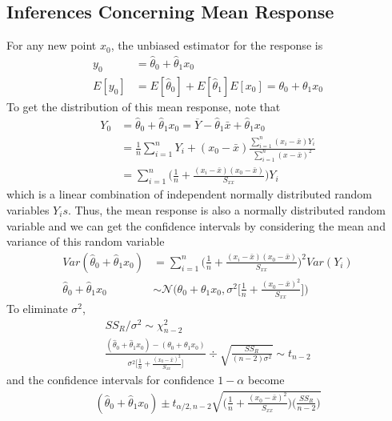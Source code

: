 \documentclass[../probability-notes.tex]{subfiles}
\begin{document}
    \subsection{Inferences Concerning Mean Response}\label{sec:infer_mean_resp}
    For any new point $x_{0}$, the unbiased estimator for the response is
    \begin{align*}
        y_{0} &= \hat{\theta}_{0} + \hat{\theta}_{1}x_{0}\\
        E[y_{0}] &= E[\hat{\theta}_{0}] + E[\hat{\theta}_{1}]E[x_{0}] = \theta_{0} + \theta_{1}x_{0}
    \end{align*}
    To get the distribution of this mean response, note that
    \begin{align*}
        Y_{0} &= \hat{\theta}_{0} + \hat{\theta}_{1}x_{0} = \overline{Y} - \hat{\theta}_{1}\bar{x} + \hat{\theta}_{1}x_{0}\\
        &= \frac{1}{n}\sum_{i=1}^{n} Y_{i} + (x_{0} - \bar{x})\frac{\sum_{i=1}^{n} (x_{i} - \bar{x})Y_{i}}{\sum_{i=1}^{n} (x-\bar{x})^{2}}\\
        &= \sum_{i=1}^{n} \bigg( \frac{1}{n} + \frac{(x_{i} - \bar{x})(x_{0} - \bar{x})}{S_{xx}} \bigg)Y_{i}
    \end{align*}
    which is a linear combination of independent normally distributed random variables $Y_{i}s$. Thus, the mean response is also a normally distributed random variable and we can get the confidence intervals by considering the mean and variance of this random variable
    \begin{align*}
        Var(\hat{\theta}_{0} + \hat{\theta}_{1}x_{0}) &= \sum_{i=1}^{n} \bigg( \frac{1}{n} + \frac{(x_{i} - \bar{x})(x_{0} - \bar{x})}{S_{xx}} \bigg)^{2}Var(Y_{i})\\
        \hat{\theta}_{0} + \hat{\theta}_{1}x_{0} &\sim \mathcal{N}\bigg(\theta_{0} + \theta_{1}x_{0}, \sigma^{2} \bigg[ \frac{1}{n} + \frac{(x_{0} - \bar{x})^{2}}{S_{xx}} \bigg]\bigg)
    \end{align*}
    To eliminate $\sigma^{2}$,
    \begin{gather*}
        SS_{R}/\sigma^{2} \sim \chi_{n-2}^{2}\\
        \frac{(\hat{\theta}_{0} + \hat{\theta}_{1}x_{0}) - (\theta_{0} + \theta_{1}x_{0})}{\sigma^{2} \bigg[ \frac{1}{n} + \frac{(x_{0} - \bar{x})^{2}}{S_{xx}} \bigg]} \div \sqrt{\frac{SS_{R}}{(n-2)\sigma^{2}}} \sim t_{n-2}
    \end{gather*}
    and the confidence intervals for confidence $1-\alpha$ become
    \begin{align*}
        (\hat{\theta}_{0} + \hat{\theta}_{1}x_{0}) \pm t_{\alpha/2, n-2} \sqrt{\bigg( \frac{1}{n} + \frac{(x_{0} - \bar{x})^{2}}{S_{xx}} \bigg) \bigg( \frac{SS_{R}}{n-2}\bigg)}
    \end{align*}
\end{document}
